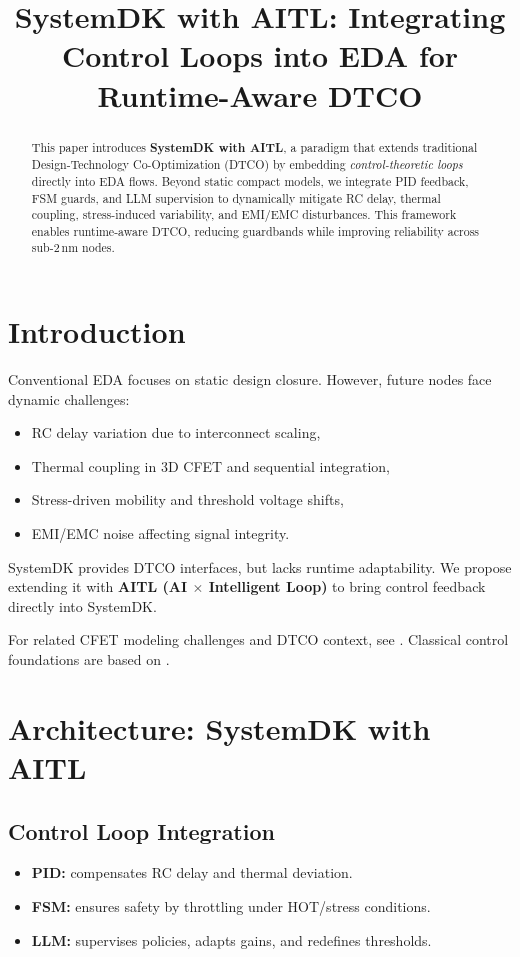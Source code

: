 \documentclass[conference]{IEEEtran}
\title{SystemDK with AITL: Integrating Control Loops into EDA for Runtime-Aware DTCO}
\author{
  \IEEEauthorblockN{Shinichi Samizo}
  \IEEEauthorblockA{Independent Semiconductor Researcher\\
  Email: \href{mailto:shin3t72@gmail.com}{shin3t72@gmail.com}}
}
\begin{document}
\maketitle

\begin{abstract}
This paper introduces \textbf{SystemDK with AITL}, a paradigm that extends 
traditional Design-Technology Co-Optimization (DTCO) by embedding 
\emph{control-theoretic loops} directly into EDA flows. 
Beyond static compact models, we integrate PID feedback, FSM guards, 
and LLM supervision to dynamically mitigate RC delay, thermal coupling, 
stress-induced variability, and EMI/EMC disturbances. 
This framework enables runtime-aware DTCO, reducing guardbands while 
improving reliability across sub-2\,nm nodes.
\end{abstract}

\section{Introduction}
Conventional EDA focuses on static design closure. 
However, future nodes face dynamic challenges: 
\begin{itemize}
  \item RC delay variation due to interconnect scaling,
  \item Thermal coupling in 3D CFET and sequential integration,
  \item Stress-driven mobility and threshold voltage shifts,
  \item EMI/EMC noise affecting signal integrity.
\end{itemize}
SystemDK provides DTCO interfaces, but lacks runtime adaptability.
We propose extending it with \textbf{AITL (AI $\times$ Intelligent Loop)} 
to bring control feedback directly into SystemDK.

For related CFET modeling challenges and DTCO context, 
see \cite{yakimets2020cfet,irds2023}.  
Classical control foundations are based on \cite{franklin2015feedback}.

\section{Architecture: SystemDK with AITL}
\subsection{Control Loop Integration}
\begin{itemize}
  \item \textbf{PID:} compensates RC delay and thermal deviation.
  \item \textbf{FSM:} ensures safety by throttling under HOT/stress conditions.
  \item \textbf{LLM:} supervises policies, adapts gains, and redefines thresholds.
\end{itemize}
\end{document}
